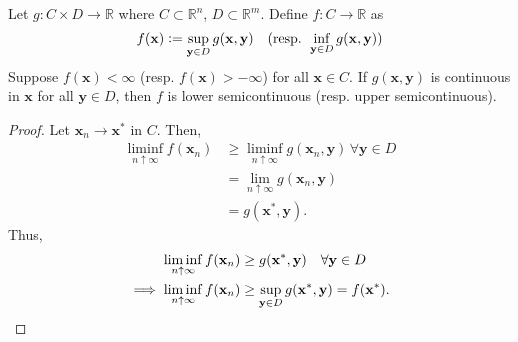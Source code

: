 \begin{prop}
    Let $g \colon C \times D \to \mathbb{R}$ where $C \subset \mathbb{R}^n$, $D \subset \mathbb{R}^m$. Define $f \colon C \to \mathbb{R}$ as
    \[
        f(\mathbf{x}) \vcentcolon= \sup_{\mathbf{y} \in D} g(\mathbf{x}, \mathbf{y}) \quad (\text{resp. } \inf_{\mathbf{y} \in D} g(\mathbf{x}, \mathbf{y}))
    \]
    Suppose $f(\mathbf{x}) < \infty$ (resp. $f(\mathbf{x}) > -\infty$) for all $\mathbf{x} \in C$. If $g(\mathbf{x},\mathbf{y})$ is continuous in $\mathbf{x}$ for all $\mathbf{y} \in D$, then $f$ is lower semicontinuous (resp. upper semicontinuous).
\end{prop}
\begin{proof}
    Let $\mathbf{x}_n \to \mathbf{x}^*$ in $C$. Then, 
    \begin{align*}
        \liminf_{n \uparrow \infty} f(\mathbf{x}_n) &\geq \liminf_{n \uparrow \infty} g(\mathbf{x}_n, \mathbf{y}) \, \forall \mathbf{y} \in D \\
        &= \lim_{n \uparrow \infty} g(\mathbf{x}_n, \mathbf{y}) \\
        &= g(\mathbf{x}^*, \mathbf{y}).
    \end{align*}
    Thus, 
    \begin{align*}
        \liminf_{n \uparrow \infty} f(\mathbf{x}_n) &\geq g(\mathbf{x}^*, \mathbf{y}) \quad \forall \mathbf{y} \in D \\
        \implies \liminf_{n \uparrow \infty} f(\mathbf{x}_n) &\geq \sup_{\mathbf{y} \in D} g(\mathbf{x}^*, \mathbf{y}) = f(\mathbf{x}^*). \qedhere
    \end{align*}
\end{proof}
